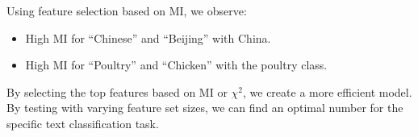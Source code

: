 \documentclass{article}
\begin{document}
Using feature selection based on MI, we observe:
\begin{itemize}
    \item High MI for “Chinese” and “Beijing” with China.
    \item High MI for “Poultry” and “Chicken” with the poultry class.
\end{itemize}

By selecting the top features based on MI or $\chi^2$, we create a more efficient model. By testing with varying feature set sizes, we can find an optimal number for the specific text classification task.
\end{document}
